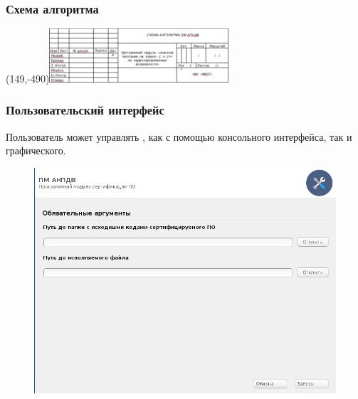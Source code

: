 \begin{frame}%
\frametitle{Схема алгоритма {\ProgModule}}

    \Put(149,-490){\includegraphics[height=2cm]{Presentation/images/algo_gost.png}}

    \begin{figure}[!htbp]
        \vspace{-1ex} 
        \hspace{-13cm} 
        \begin{adjustbox}{max totalsize={1.6\textwidth}{1.6\textheight},left}
            
        \end{adjustbox}
    \end{figure}
\end{frame}

\begin{frame}%
\frametitle{Пользовательский интерфейс {\ProgModule}}
    Пользователь может управлять {\ProgModule}, как с помощью
    консольного интерфейса, так и графического.
    \begin{figure}[!htbp]
        \begin{adjustbox}{max totalsize={0.8\textwidth}{0.8\textheight}}
            \includegraphics[trim={0.2em 0 0 0},clip,width=\linewidth]{images/apndv-gui.png}
        \end{adjustbox}
    \end{figure}

\end{frame}


